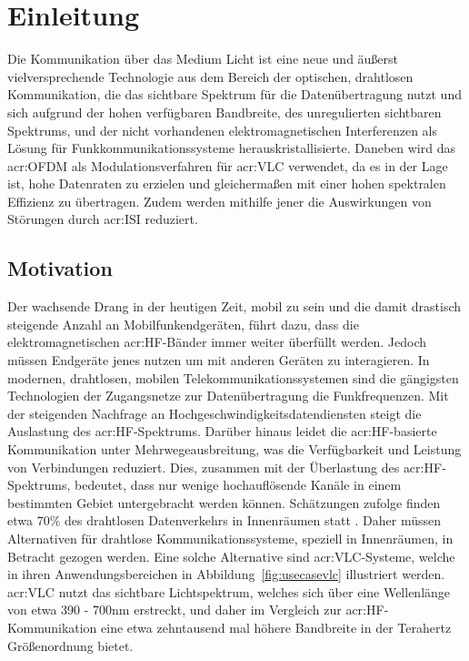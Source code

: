 
\chapter{Einleitung}
\label{sec:introduction}

Die Kommunikation über das Medium Licht ist eine neue und äußerst vielversprechende Technologie aus dem Bereich der optischen, drahtlosen Kommunikation, die das sichtbare Spektrum für die Datenübertragung nutzt und sich aufgrund der hohen verfügbaren Bandbreite, des unregulierten sichtbaren Spektrums, und der nicht vorhandenen elektromagnetischen Interferenzen als Lösung für Funkkommunikationssysteme herauskristallisierte. Daneben wird das \gls{acr:OFDM} als Modulationsverfahren für \gls{acr:VLC} verwendet, da es in der Lage ist, hohe Datenraten zu erzielen und gleichermaßen mit einer hohen spektralen Effizienz zu übertragen. Zudem werden mithilfe jener die Auswirkungen von Störungen durch \gls{acr:ISI} reduziert.

\section{Motivation}
\label{sec:motivation}

Der wachsende Drang in der heutigen Zeit, mobil zu sein und die damit drastisch steigende Anzahl an Mobilfunkendgeräten, führt dazu, dass die elektromagnetischen \gls{acr:HF}-Bänder immer weiter überfüllt werden. Jedoch müssen Endgeräte jenes nutzen um mit anderen Geräten zu interagieren. In modernen, drahtlosen, mobilen Telekommunikationssystemen sind die gängigsten Technologien der Zugangsnetze zur Datenübertragung die Funkfrequenzen. Mit der steigenden Nachfrage an Hochgeschwindigkeitsdatendiensten steigt die Auslastung des \gls{acr:HF}-Spektrums. Darüber hinaus leidet die \gls{acr:HF}-basierte Kommunikation unter Mehrwegeausbreitung, was die Verfügbarkeit und Leistung von Verbindungen reduziert. Dies, zusammen mit der Überlastung des \gls{acr:HF}-Spektrums, bedeutet, dass nur wenige hochauflösende Kanäle in einem bestimmten Gebiet untergebracht werden können. Schätzungen zufolge finden etwa 70\% des drahtlosen Datenverkehrs in Innenräumen statt \cite{vlc2}. Daher müssen Alternativen für drahtlose Kommunikationssysteme, speziell in Innenräumen, in Betracht gezogen werden.
Eine solche Alternative sind \gls{acr:VLC}-Systeme, welche in ihren Anwendungsbereichen in Abbildung~\ref{fig:usecasevlc} illustriert werden. \gls{acr:VLC} nutzt das sichtbare Lichtspektrum, welches sich über eine Wellenlänge von etwa 390 - 700nm erstreckt, und daher im Vergleich zur \gls{acr:HF}-Kommunikation eine etwa zehntausend mal höhere Bandbreite in der Terahertz Größenordnung bietet.\cite{ghassemlooyVisibleLightCommunications} 

